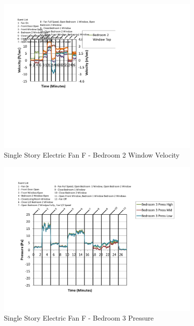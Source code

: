 \documentclass{article}
\begin{document}
\begin{appendices}
	\begin{figure}[H]
		\centering
		\includegraphics[height=3.05in,trim=0.67in 1.1in 0.67in 0.8in,clip=true]{0_Images/Results_Charts/ColdFlow/Single_Story/Electric/F/Bedroom_2_Window_Velocity.pdf}
		\caption{Single Story Electric Fan F - Bedroom 2 Window Velocity}
	\end{figure}
 

	\begin{figure}[H]
		\centering
		\includegraphics[height=3.05in,trim=0.67in 1.1in 0.67in 0.8in,clip=true]{0_Images/Results_Charts/ColdFlow/Single_Story/Electric/F/Bedroom_3_Pressure.pdf}
		\caption{Single Story Electric Fan F - Bedroom 3 Pressure}
	\end{figure}
 
	\clearpage


\end{appendices}
\end{document}
